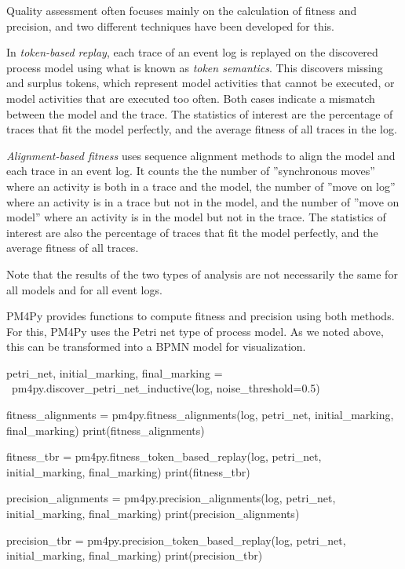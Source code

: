 \begin{advanced}
Quality assessment often focuses mainly on the calculation of fitness and precision, and two different techniques have been developed for this.

In \emph{token-based replay}, each trace of an event log is replayed on the discovered process model using what is known as \emph{token semantics}. This discovers missing and surplus tokens, which represent model activities that cannot be executed, or model activities that are executed too often. Both cases indicate a mismatch between the model and the trace. The statistics of interest are the percentage of traces that fit the model perfectly, and the average fitness of all traces in the log.

\emph{Alignment-based fitness} uses sequence alignment methods to align the model and each trace in an event log. It counts the the number of ''synchronous moves'' where an activity is both in a trace and the model, the number of ''move on log'' where an activity is in a trace but not in the model, and the number of ''move on model'' where an activity is in the model but not in the trace. The statistics of interest are also the percentage of traces that fit the model perfectly, and the average fitness of all traces.

Note that the results of the two types of analysis are not necessarily the same for all models and for all event logs.
\end{advanced}

\begin{withcode}
PM4Py provides functions to compute fitness and precision using both methods. For this, PM4Py uses the Petri net type of process model. As we noted above, this can be transformed into a BPMN model for visualization. 

\begin{pythoncode}
petri_net, initial_marking, final_marking = \
    pm4py.discover_petri_net_inductive(log, noise_threshold=0.5)

fitness_alignments = pm4py.fitness_alignments(log,
    petri_net, initial_marking, final_marking)
print(fitness_alignments)

fitness_tbr = pm4py.fitness_token_based_replay(log, 
    petri_net, initial_marking, final_marking)
print(fitness_tbr)

precision_alignments = pm4py.precision_alignments(log,
    petri_net, initial_marking, final_marking)
print(precision_alignments)

precision_tbr = pm4py.precision_token_based_replay(log, 
    petri_net, initial_marking, final_marking)
print(precision_tbr)
\end{pythoncode}
\end{withcode}

